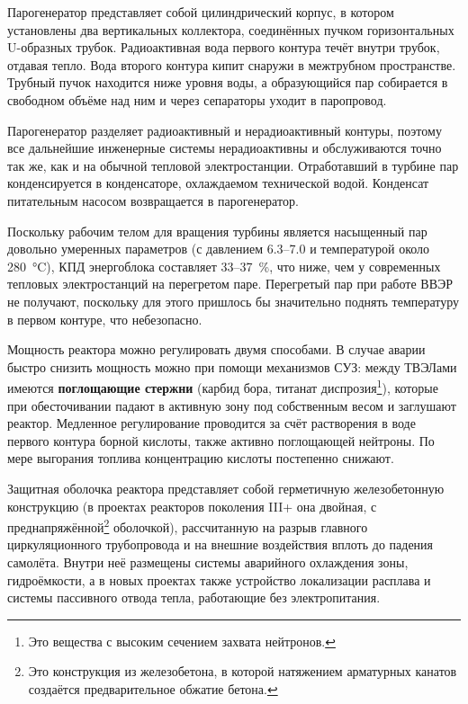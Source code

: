 Парогенератор представляет собой цилиндрический корпус, в котором установлены два вертикальных коллектора, соединённых пучком горизонтальных U-образных трубок. Радиоактивная вода первого контура течёт внутри трубок, отдавая тепло. Вода второго контура кипит снаружи в межтрубном пространстве. Трубный пучок находится ниже уровня воды, а образующийся пар собирается в свободном объёме над ним и через сепараторы уходит в паропровод.

Парогенератор разделяет радиоактивный и нерадиоактивный контуры, поэтому все дальнейшие инженерные системы нерадиоактивны и обслуживаются точно так же, как и на обычной тепловой электростанции. Отработавший в турбине пар конденсируется в конденсаторе, охлаждаемом технической водой. Конденсат питательным насосом возвращается в парогенератор.

Поскольку рабочим телом для вращения турбины является насыщенный пар довольно умеренных параметров (с давлением \num{6,3}--\qty{7,0}{\ruMPa} и температурой около \qty{280}{\degreeCelsius}), КПД энергоблока составляет \num{33}--\qty{37}{\percent}, что ниже, чем у современных тепловых электростанций на перегретом паре. Перегретый пар при работе ВВЭР не получают, поскольку для этого пришлось бы значительно поднять температуру в первом контуре, что небезопасно.

Мощность реактора можно регулировать двумя способами. В случае аварии быстро снизить мощность можно при помощи механизмов СУЗ: между ТВЭЛами имеются \textbf{поглощающие стержни} (карбид бора, титанат диспрозия\footnote{Это вещества с высоким сечением захвата нейтронов.}), которые при обесточивании падают в активную зону под собственным весом и заглушают реактор. Медленное регулирование проводится за счёт растворения в воде первого контура борной кислоты, также активно поглощающей нейтроны. По мере выгорания топлива концентрацию кислоты постепенно снижают.

Защитная оболочка реактора представляет собой герметичную железобетонную конструкцию (в проектах реакторов поколения III+ она двойная, с преднапряжённой\footnote{Это конструкция из железобетона, в которой натяжением арматурных канатов создаётся предварительное обжатие бетона.} оболочкой), рассчитанную на разрыв главного циркуляционного трубопровода и на внешние воздействия вплоть до падения самолёта. Внутри неё размещены системы аварийного охлаждения зоны, гидроёмкости, а в новых проектах также устройство локализации расплава и системы пассивного отвода тепла, работающие без электропитания.


